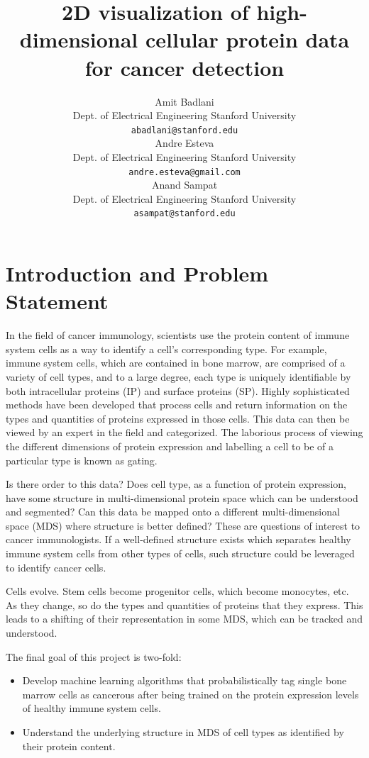 \documentclass{article} %
\title{2D visualization of high-dimensional cellular protein data for cancer detection}
\author{
Amit Badlani \\
Dept. of Electrical Engineering Stanford University \\
\texttt{abadlani@stanford.edu} \\
\AND
Andre Esteva \\
Dept. of Electrical Engineering Stanford University \\
\texttt{andre.esteva@gmail.com} \\
\And
Anand Sampat\\
Dept. of Electrical Engineering Stanford University \\
\texttt{asampat@stanford.edu} \\
}
\begin{document}
\maketitle

\begin{abstract}

\end{abstract}

\section{Introduction and Problem Statement}
\label{intro}
In the field of cancer immunology, scientists use the protein content of immune system cells as a way to identify a cell's corresponding type. For example, immune system cells, which are contained in bone marrow, are comprised of a variety of cell types, and to a large degree, each type is uniquely identifiable by both intracellular proteins (IP) and surface proteins (SP). Highly sophisticated methods have been developed that process cells and return information on the types and quantities of proteins expressed in those cells. This data can then be viewed by an expert in the field and categorized. The laborious process of viewing the different dimensions of protein expression and labelling a cell to be of a particular type is known as gating. 

Is there order to this data? Does cell type, as a function of protein expression, have some structure in multi-dimensional protein space which can be understood and segmented? Can this data be mapped onto a different multi-dimensional space (MDS) where structure is better defined? These are questions of interest to cancer immunologists. If a well-defined structure exists which separates healthy immune system cells from other types of cells, such structure could be leveraged to identify cancer cells.

Cells evolve. Stem cells become progenitor cells, which become monocytes, etc. As they change, so do the types and quantities of proteins that they express. This leads to a shifting of their representation in some MDS, which can be tracked and understood. 

The final goal of this project is two-fold:
\begin{itemize}
\item Develop machine learning algorithms that probabilistically tag single bone marrow cells as cancerous after being trained on the protein expression levels of healthy immune system cells.
\item Understand the underlying structure in MDS of cell types as identified by their protein content. 
\end{itemize}
\end{document}
